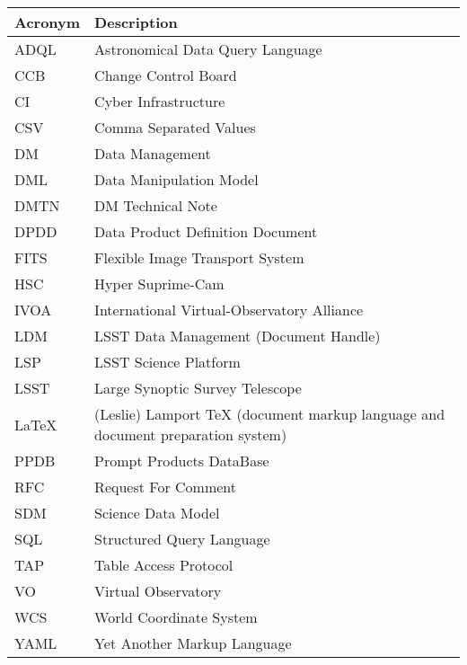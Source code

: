 \addtocounter{table}{-1}
\begin{longtable}{p{}p{}}\hline
\textbf{Acronym} & \textbf{Description}  \\\hline

ADQL & Astronomical Data Query Language \\\hline
CCB & Change Control Board \\\hline
CI & Cyber Infrastructure \\\hline
CSV & Comma Separated Values \\\hline
DM & Data Management \\\hline
DML & Data Manipulation Model \\\hline
DMTN & DM Technical Note \\\hline
DPDD & Data Product Definition Document \\\hline
FITS & Flexible Image Transport System \\\hline
HSC & Hyper Suprime-Cam \\\hline
IVOA & International Virtual-Observatory Alliance \\\hline
LDM & LSST Data Management (Document Handle) \\\hline
LSP & LSST Science Platform \\\hline
LSST & Large Synoptic Survey Telescope \\\hline
LaTeX & (Leslie) Lamport TeX (document markup language and document preparation system) \\\hline
PPDB & Prompt Products DataBase \\\hline
RFC & Request For Comment \\\hline
SDM & Science Data Model \\\hline
SQL & Structured Query Language \\\hline
TAP & Table Access Protocol \\\hline
VO & Virtual Observatory \\\hline
WCS & World Coordinate System \\\hline
YAML & Yet Another Markup Language \\\hline
\end{longtable}
